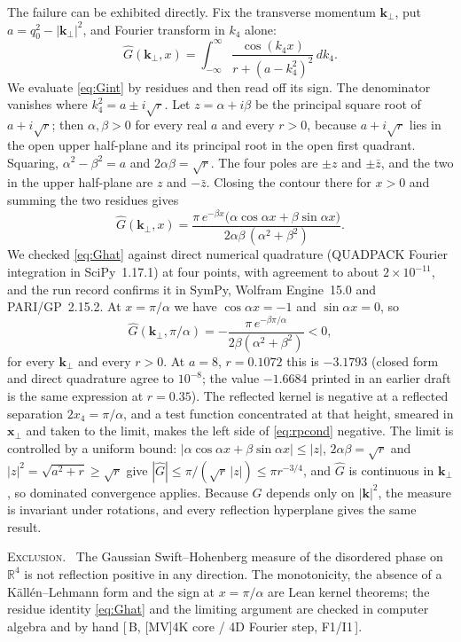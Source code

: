 \documentclass[a4paper,11pt]{article}
\makeatletter
\numberwithin{equation}{section}
\theoremstyle{jsplain}
\theoremstyle{jsrem}
\newcommand{\lbl}[1]{\textcolor{lbl@#1}{\textsc{#1}}.\ }
\newcommand{\grade}[1]{[\,#1\,]}
\makeatother
\begin{document}
The failure can be exhibited directly. Fix the transverse momentum $\mathbf{k}_\perp$, put $a=q_0^2-|\mathbf{k}_\perp|^2$, and Fourier transform in $k_4$ alone:
\begin{equation}\label{eq:Gint}
\hat G(\mathbf{k}_\perp,x)=\int_{-\infty}^{\infty}\frac{\cos(k_4x)}{r+(a-k_4^2)^2}\,dk_4 .
\end{equation}
We evaluate \eqref{eq:Gint} by residues and then read off its sign.
The denominator vanishes where $k_4^2=a\pm i\sqrt r$. Let $z=\alpha+i\beta$ be the principal square root of $a+i\sqrt r$; then $\alpha,\beta>0$ for every real $a$ and every $r>0$, because $a+i\sqrt r$ lies in the open upper half-plane and its principal root in the open first quadrant. Squaring, $\alpha^2-\beta^2=a$ and $2\alpha\beta=\sqrt r$. The four poles are $\pm z$ and $\pm\bar z$, and the two in the upper half-plane are $z$ and $-\bar z$. Closing the contour there for $x>0$ and summing the two residues gives
\begin{equation}\label{eq:Ghat}
\hat G(\mathbf{k}_\perp,x)=\frac{\pi\,e^{-\beta x}\big(\alpha\cos\alpha x+\beta\sin\alpha x\big)}{2\alpha\beta\,(\alpha^2+\beta^2)} .
\end{equation}
We checked \eqref{eq:Ghat} against direct numerical quadrature (QUADPACK Fourier integration in SciPy~1.17.1) at four points, with agreement to about $2\times10^{-11}$, and the run record confirms it in SymPy, Wolfram Engine~15.0 and PARI/GP~2.15.2. At $x=\pi/\alpha$ we have $\cos\alpha x=-1$ and $\sin\alpha x=0$, so
\[
\hat G(\mathbf{k}_\perp,\pi/\alpha)=-\frac{\pi\,e^{-\beta\pi/\alpha}}{2\beta(\alpha^2+\beta^2)}<0,
\]
for every $\mathbf{k}_\perp$ and every $r>0$. At $a=8$, $r=0.1072$ this is $-3.1793$ (closed form and direct quadrature agree to $10^{-8}$; the value $-1.6684$ printed in an earlier draft is the same expression at $r=0.35$). The reflected kernel is negative at a reflected separation $2x_4=\pi/\alpha$, and a test function concentrated at that height, smeared in $\mathbf{x}_\perp$ and taken to the limit, makes the left side of \eqref{eq:rpcond} negative. The limit is controlled by a uniform bound: $|\alpha\cos\alpha x+\beta\sin\alpha x|\le|z|$, $2\alpha\beta=\sqrt r$ and $|z|^2=\sqrt{a^2+r}\ge\sqrt r$ give $|\hat G|\le\pi/(\sqrt r\,|z|)\le\pi r^{-3/4}$, and $\hat G$ is continuous in $\mathbf{k}_\perp$, so dominated convergence applies. Because $G$ depends only on $|\mathbf{k}|^2$, the measure is invariant under rotations, and every reflection hyperplane gives the same result.

\lbl{Exclusion} The Gaussian Swift--Hohenberg measure of the disordered phase on $\mathbb{R}^4$ is not reflection positive in any direction. The monotonicity, the absence of a Källén--Lehmann form and the sign at $x=\pi/\alpha$ are Lean kernel theorems; the residue identity \eqref{eq:Ghat} and the limiting argument are checked in computer algebra and by hand \grade{B, [MV]4K core / 4D Fourier step, F1/I1}.
\end{document}
